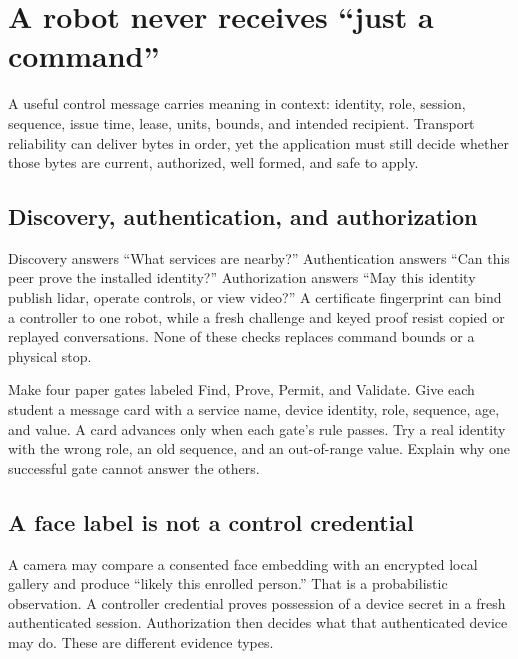
\chapter{A robot never receives ``just a command''}

A useful control message carries meaning in context: identity, role, session, sequence, issue time, lease, units, bounds, and intended recipient. Transport reliability can deliver bytes in order, yet the application must still decide whether those bytes are current, authorized, well formed, and safe to apply.

\section*{Discovery, authentication, and authorization}

Discovery answers ``What services are nearby?'' Authentication answers ``Can this peer prove the installed identity?'' Authorization answers ``May this identity publish lidar, operate controls, or view video?'' A certificate fingerprint can bind a controller to one robot, while a fresh challenge and keyed proof resist copied or replayed conversations. None of these checks replaces command bounds or a physical stop.

\begin{missionbox}[title={THE FOUR GATES}]
Make four paper gates labeled Find, Prove, Permit, and Validate. Give each student a message card with a service name, device identity, role, sequence, age, and value. A card advances only when each gate's rule passes. Try a real identity with the wrong role, an old sequence, and an out-of-range value. Explain why one successful gate cannot answer the others.
\end{missionbox}

\section*{A face label is not a control credential}

A camera may compare a consented face embedding with an encrypted local gallery and produce ``likely this enrolled person.'' That is a probabilistic observation. A controller credential proves possession of a device secret in a fresh authenticated session. Authorization then decides what that authenticated device may do. These are different evidence types.

